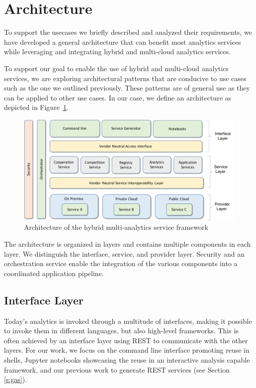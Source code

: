 
\section{Architecture}

To support the usecases we briefly described and analyzed their requirements, 
we have developed a general architecture that can benefit most analytics services while leveraging and integrating hybrid and multi-cloud analytics services.

To support our goal to enable the use of hybrid and multi-cloud analytics
services, we are exploring architectural patterns
that are conducive to use cases such as the one we outlined
previously. These patterns are of general use as they can
be applied to other use cases. In our case, we define an
architecture as depicted in Figure~\ref{fig:arch}.

\begin{figure}[htb]
  \begin{center}
    \includegraphics[width=1.0\columnwidth]{images/hybrid-service-arch.pdf}
    \end{center}
  \caption {Architecture of the hybrid multi-analytics service
    framework}
  \label{fig:arch}
\end{figure}

The architecture is organized in layers and contains
multiple components in each layer. We distinguish the interface,
service, and provider layer. Security and an orchestration service
enable the integration of the various components into a coordinated
application pipeline.

\subsection{Interface Layer}

Today's analytics is invoked through a multitude of interfaces, making
it possible to invoke them in different languages, but also high-level
frameworks. This is often achieved by an interface layer using REST
to communicate with the other layers. For our work, we focus on
the command line interface promoting reuse in shells, Jupyter notebooks
showcasing the reuse in an interactive analysis capable framework, and
our previous work to generate REST services (see Section \ref{s:gas}).

